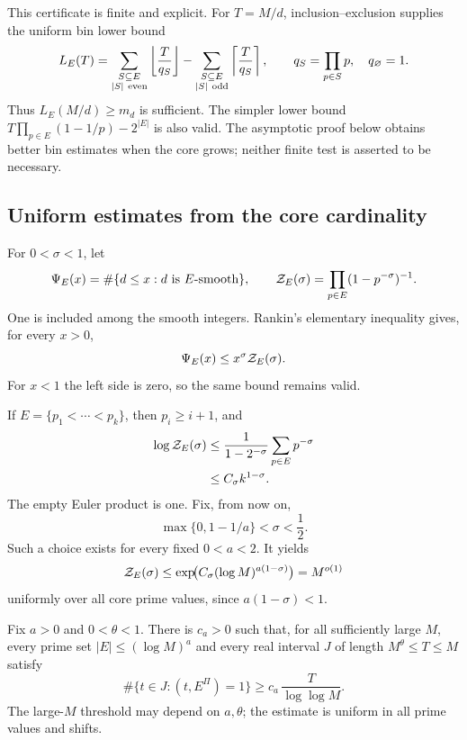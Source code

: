 This certificate is finite and explicit. For \(T=M/d\),
inclusion--exclusion supplies the uniform bin lower bound
\[
 L_E(T)=
 \sum_{\substack{S\subseteq E\\|S|\ {\rm even}}}
      \left\lfloor\frac T{q_S}\right\rfloor
 -\sum_{\substack{S\subseteq E\\|S|\ {\rm odd}}}
      \left\lceil\frac T{q_S}\right\rceil,
 \qquad q_S=\prod_{p\in S}p,\quad q_\varnothing=1.
\]
Thus \(L_E(M/d)\ge m_d\) is sufficient. The simpler lower bound
\(T\prod_{p\in E}(1-1/p)-2^{|E|}\) is also valid.
The asymptotic proof below obtains better bin estimates when the
core grows; neither finite test is asserted to be necessary.

\subsection{Uniform estimates from the core cardinality}

For \(0<\sigma<1\), let
\[
 \Psi_E(x)=\#\{d\le x:d\text{ is }E\text{-smooth}\},
 \qquad
 {\cal Z}_E(\sigma)=\prod_{p\in E}(1-p^{-\sigma})^{-1}.
\]
One is included among the smooth integers. Rankin's elementary
inequality gives, for every \(x>0\),
\begin{equation}
 \Psi_E(x)\le x^\sigma{\cal Z}_E(\sigma).
 \label{sc:rankin}
\end{equation}
For \(x<1\) the left side is zero, so the same bound remains valid.

If \(E=\{p_1<\cdots<p_k\}\), then \(p_i\ge i+1\), and
\[
 \begin{split}
 \log{\cal Z}_E(\sigma)
 &\le\frac1{1-2^{-\sigma}}\sum_{p\in E}p^{-\sigma}\\
 &\le C_\sigma k^{1-\sigma}.
 \end{split}
\]
The empty Euler product is one. Fix, from now on,
\begin{equation}
 \max\{0,1-1/a\}<\sigma<\frac12.
 \label{sc:sigma-choice}
\end{equation}
Such a choice exists for every fixed \(0<a<2\). It yields
\begin{equation}
 {\cal Z}_E(\sigma)
 \le\exp\!\bigl(C_\sigma(\log M)^{a(1-\sigma)}\bigr)
 =M^{o(1)}
 \label{sc:euler-uniform}
\end{equation}
uniformly over all core prime values, since \(a(1-\sigma)<1\).

\begin{lemma}
\label{sc:bins}
Fix \(a>0\) and \(0<\theta<1\). There is \(c_a>0\) such that,
for all sufficiently large \(M\), every prime set
\(|E|\le(\log M)^a\) and every real interval \(J\) of length
\(M^\theta\le T\le M\) satisfy
\begin{equation}
 \#\{t\in J:(t,E^\Pi)=1\}
 \ge c_a\,\frac T{\log\log M}.
 \label{sc:bin-density}
\end{equation}
The large-\(M\) threshold may depend on \(a,\theta\); the estimate
is uniform in all prime values and shifts.
\end{lemma}

